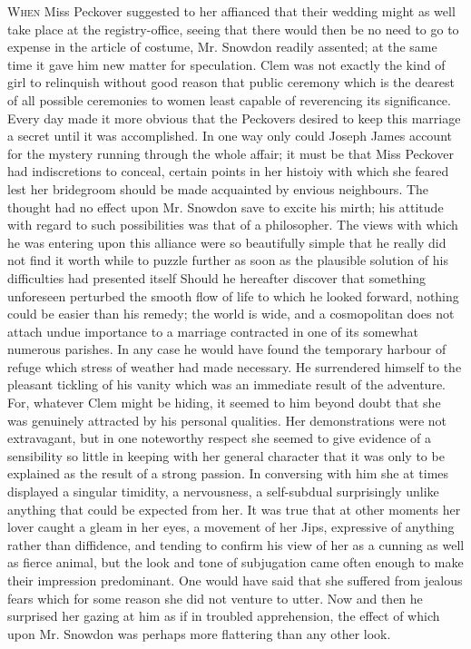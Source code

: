 \textsc{When} Miss Peckover suggested to her affianced that their
wedding might as well take place at the registry-office, seeing that
there would then be no need to go to expense in the article of costume,
Mr. Snowdon readily assented; at the same time it gave him new matter
for speculation. Clem was not exactly the kind of girl to relinquish
without good reason that public ceremony which is the dearest of all
possible ceremonies to women least capable of reverencing its
significance. Every day made it more obvious that the Peckovers desired
to keep this marriage a secret until it was accomplished. In one way
only could Joseph James account for the mystery running through the
whole affair; it must be {\protect\hypertarget{60}{}{}}that Miss
Peckover had indiscretions to conceal, certain points in her histoiy
with which she feared lest her bridegroom should be made acquainted by
envious neighbours. The thought had no effect upon Mr. Snowdon save to
excite his mirth; his attitude with regard to such possibilities was
that of a philosopher. The views with which he was entering upon this
alliance were so beautifully simple that he really did not find it worth
while to puzzle further as soon as the plausible solution of his
difficulties had presented itself Should he hereafter discover that
something unforeseen perturbed the smooth flow of life to which he
looked forward, nothing could be easier than his remedy; the world is
wide, and a cosmopolitan does not attach undue importance to a marriage
contracted in one of its somewhat numerous parishes. In any case he
would have found the temporary harbour of refuge which stress of weather
had made necessary. He surrendered himself to the pleasant tickling of
his vanity which was an immediate result of the adventure. For,
{\protect\hypertarget{61}{}{}}whatever Clem might be hiding, it seemed
to him beyond doubt that she was genuinely attracted by his personal
qualities. Her demonstrations were not extravagant, but in one
noteworthy respect she seemed to give evidence of a sensibility so
little in keeping with her general character that it was only to be
explained as the result of a strong passion. In conversing with him she
at times displayed a singular timidity, a nervousness, a self-subdual
surprisingly unlike anything that could be expected from her. It was
true that at other moments her lover caught a gleam in her eyes, a
movement of her Jips, expressive of anything rather than diffidence, and
tending to confirm his view of her as a cunning as well as fierce
animal, but the look and tone of subjugation came often enough to make
their impression predominant. One would have said that she suffered from
jealous fears which for some reason she did not venture to utter. Now
and then he surprised her gazing at him as if in troubled apprehension,
the effect of which {\protect\hypertarget{62}{}{}}upon Mr. Snowdon was
perhaps more flattering than any other look.

